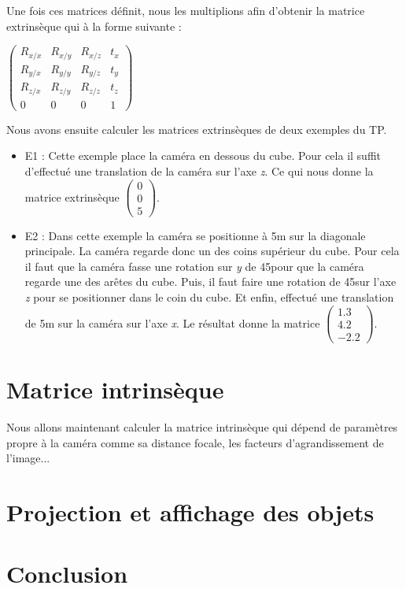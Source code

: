 \documentclass[a4paper,11pt]{article}
\begin{document}
  Une fois ces matrices définit, nous les multiplions afin d'obtenir la matrice
  extrinsèque qui à la forme suivante :\\
  \begin{center}
    $\begin{pmatrix}
      R_{x/x} & R_{x/y} & R_{x/z} & t_{x}\\
      R_{y/x} & R_{y/y} & R_{y/z} & t_{y}\\
      R_{z/x} & R_{z/y} & R_{z/z} & t_{z}\\
      0 & 0 & 0 & 1
      \end{pmatrix}$
  \end{center}

  
  Nous avons ensuite calculer les matrices extrinsèques de deux exemples du TP.\\
  
  \begin{itemize}
   \item E1 : Cette exemple place la caméra en dessous du cube. Pour cela il suffit
   d'effectué une translation de la caméra sur l'axe \textit{z}. Ce qui nous donne la matrice
   extrinsèque 
    $\begin{pmatrix}
      0\\
      0\\
      5
      \end{pmatrix}$.
   \item E2 : Dans cette exemple la caméra se positionne à 5m sur la diagonale principale.
   La caméra regarde donc un des coins supérieur du cube. Pour cela il faut que la caméra 
   fasse une rotation sur \textit{y} de 45\degre pour que la caméra regarde une des arêtes du cube. Puis,
   il faut faire une rotation de 45\degre sur l'axe \textit{z} pour se positionner dans le coin du cube. 
   Et enfin, effectué une translation de 5m sur la caméra sur l'axe \textit{x}. Le résultat donne la matrice
   $\begin{pmatrix}
      1.3\\
      4.2\\
      -2.2 
      \end{pmatrix}$.
  \end{itemize}
  
  
  \section{Matrice intrinsèque}
  
  Nous allons maintenant calculer la matrice intrinsèque qui dépend de paramètres propre à la caméra comme
  sa distance focale, les facteurs d'agrandissement de l'image... 
  \section{Projection et affichage des objets}
  
  
  \section*{Conclusion}
  
    
\end{document}
